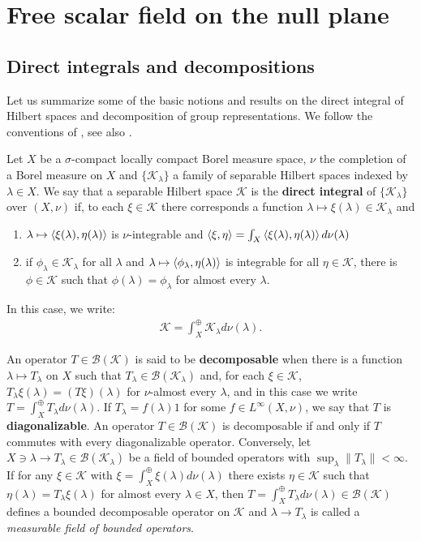 \documentclass[12pt]{article}
\def\B{{\mathcal B}}
\def\K{{\mathcal K}}
\def\l{\lambda}
\theoremstyle{remark}
\begin{document}
\section{Free scalar field on the null plane}\label{free}
\subsection{Direct integrals and decompositions}\label{direct}
Let us summarize some of the basic notions and results on the direct integral of Hilbert spaces and decomposition of group representations.
We follow the conventions of \cite{Dixmier81}, see also \cite{KR97-2}. 

Let $X$ be a $\sigma$-compact locally compact Borel measure space, $\nu$ the completion of a Borel measure on $X$ and $\{\K_\l  \}$ a family of separable Hilbert spaces indexed by $\l\in X$. We say that a separable Hilbert space $\K$ is the \textbf{direct integral} of $\{ \K_\l\}$ over $(X,\nu)$ if, to each $\xi\in \K$ there corresponds a function $\l\mapsto \xi(\l) \in \K_\l$ and 
\begin{enumerate}
\item $\l\mapsto \braket{\xi(\l),\eta(\l)}$ is $\nu$-integrable and $\braket{\xi,\eta}=\int_X \braket{\xi(\l),\eta(\l)} d\nu(\l)$
\item if $\phi_\l \in \K_\l$ for all $\l$ and $\l\mapsto \braket{\phi_\l,\eta(\l)}$ is integrable for all $\eta\in \K$, there is $\phi\in \K$ such that $\phi(\l)=\phi_\l$ for almost every $\l$.
\end{enumerate}
In this case, we write:
\begin{align*}
\K=\int_X^\oplus \K_\l d\nu(\l).
\end{align*}

An operator $T\in \B(\K)$ is said to be \textbf{decomposable} when there is a function $\l\mapsto T_\l $ on $X$ such that $T_\l \in \B(\K_\l)$ and, for each $\xi \in \K$, $T_\l \xi(\l)=(T\xi)(\l)$ for $\nu$-almost every $\l$, and in this case we write
$T = \int_X^\oplus T_\l d\nu(\l)$.
If $T_\l =f(\l)1$ for some $f\in L^\infty(X,\nu)$, we say that $T$ is \textbf{diagonalizable}.
An operator $T\in \B(\K)$ is decomposable if and only if $T$ commutes with every diagonalizable operator.
Conversely,
let $X\ni\lambda\rightarrow T_\lambda\in \B(\K_\lambda)$ be a field of bounded operators
with $\sup_\lambda \|T_\lambda\| < \infty$.
If for any $\xi\in\K$ with $\xi=\int_X^\oplus \xi(\lambda) d\nu(\lambda)$ there exists $\eta\in\K$ such that $\eta(\lambda)=T_\lambda\xi(\lambda)$ for almost every $\lambda\in X$, then $T=\int_X^\oplus T_\lambda d\nu(\lambda)\in\B(\K)$ defines a bounded decomposable operator on $\K$ and $\lambda\rightarrow T_\lambda$ is called a \textit{measurable field of bounded operators}.
\end{document}
